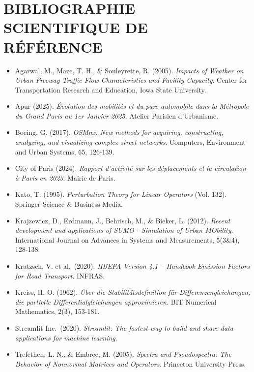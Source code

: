 \documentclass[10pt, a4paper]{article}
\providecommand{\tightlist}{}
\begin{document}
\newpage

\section{BIBLIOGRAPHIE SCIENTIFIQUE DE
RÉFÉRENCE}\label{bibliographie-scientifique-de-ruxe9fuxe9rence}

\begin{itemize}
\tightlist
\item
  Agarwal, M., Maze, T. H., \& Souleyrette, R. (2005). \emph{Impacts of
  Weather on Urban Freeway Traffic Flow Characteristics and Facility
  Capacity}. Center for Transportation Research and Education, Iowa
  State University.
\item
  Apur (2025). \emph{Évolution des mobilités et du parc automobile dans
  la Métropole du Grand Paris au 1er Janvier 2025}. Atelier Parisien
  d'Urbanisme.
\item
  Boeing, G. (2017). \emph{OSMnx: New methods for acquiring,
  constructing, analyzing, and visualizing complex street networks}.
  Computers, Environment and Urban Systems, 65, 126-139.
\item
  City of Paris (2024). \emph{Rapport d'activité sur les déplacements et
  la circulation à Paris en 2023}. Mairie de Paris.
\item
  Kato, T. (1995). \emph{Perturbation Theory for Linear Operators} (Vol.
  132). Springer Science \& Business Media.
\item
  Krajzewicz, D., Erdmann, J., Behrisch, M., \& Bieker, L. (2012).
  \emph{Recent development and applications of SUMO - Simulation of
  Urban MObility}. International Journal on Advances in Systems and
  Measurements, 5(3\&4), 128-138.
\item
  Kratzsch, V. et al.~(2020). \emph{HBEFA Version 4.1 -- Handbook
  Emission Factors for Road Transport}. INFRAS.
\item
  Kreiss, H. O. (1962). \emph{Über die Stabilitätsdefinition für
  Differenzengleichungen, die partielle Differentialgleichungen
  approximieren}. BIT Numerical Mathematics, 2(3), 153-181.
\item
  Streamlit Inc.~(2020). \emph{Streamlit: The fastest way to build and
  share data applications for machine learning}.
\item
  Trefethen, L. N., \& Embree, M. (2005). \emph{Spectra and
  Pseudospectra: The Behavior of Nonnormal Matrices and Operators}.
  Princeton University Press.
\end{itemize}
\end{document}
